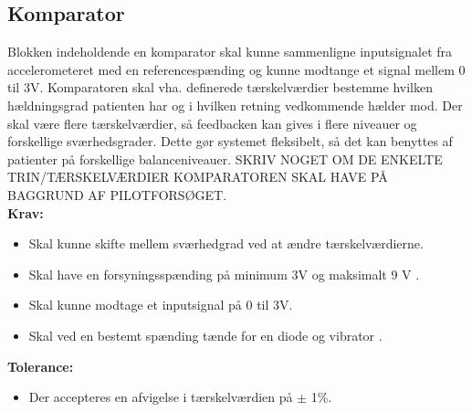 \subsection{Komparator} 
Blokken indeholdende en komparator skal kunne sammenligne inputsignalet fra accelerometeret med en referencespænding og kunne modtange et signal mellem 0 til 3V. Komparatoren skal vha. definerede tærskelværdier bestemme hvilken hældningsgrad patienten har og i hvilken retning vedkommende hælder mod. Der skal være flere tærskelværdier, så feedbacken kan gives i flere niveauer og forskellige sværhedsgrader. Dette gør systemet fleksibelt, så det kan benyttes af patienter på forskellige balanceniveauer.
SKRIV NOGET OM DE ENKELTE TRIN/TÆRSKELVÆRDIER KOMPARATOREN SKAL HAVE PÅ BAGGRUND AF PILOTFORSØGET. \\
\textbf{Krav:}
\begin{itemize}
\item Skal kunne skifte mellem sværhedgrad ved at ændre tærskelværdierne.
\item Skal have en forsyningsspænding på minimum 3V og maksimalt 9 V .
\item Skal kunne modtage et inputsignal på 0 til 3V.
\item Skal ved en bestemt spænding  tænde for en diode og vibrator .
\end{itemize}
\textbf{Tolerance:}
\begin{itemize}
\item Der accepteres en afvigelse i tærskelværdien på $\pm$ 1\%.
\end{itemize}
